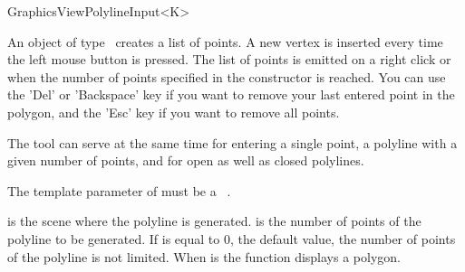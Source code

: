 \begin{ccRefClass}[Qt::]{GraphicsViewPolylineInput<K>}

\ccDefinition
An object of type \ccRefName\ creates a list of points. A new 
vertex is inserted every time the left mouse button is pressed.
The list of points is emitted on a right click or when the number of
points specified in the constructor is reached. You can use the 'Del'
or 'Backspace' key if you want to remove your last entered point in the polygon,
and the 'Esc' key if you want to remove all points.

The tool can serve at the same time for entering a single point,
a polyline with a given number of points, and for open as well as closed
polylines.


\ccParameters

The template parameter of  must be a \cgal\ . 

\ccInheritsFrom
{}

\ccGlue

\ccCreation
{}

{ is the scene where the polyline is generated.  is the
  number of points of the polyline to be generated. If  is equal to 0,
  the default value, the number of points of the polyline is not
  limited. When  is  the function displays a
  polygon.}



\end{ccRefClass}







